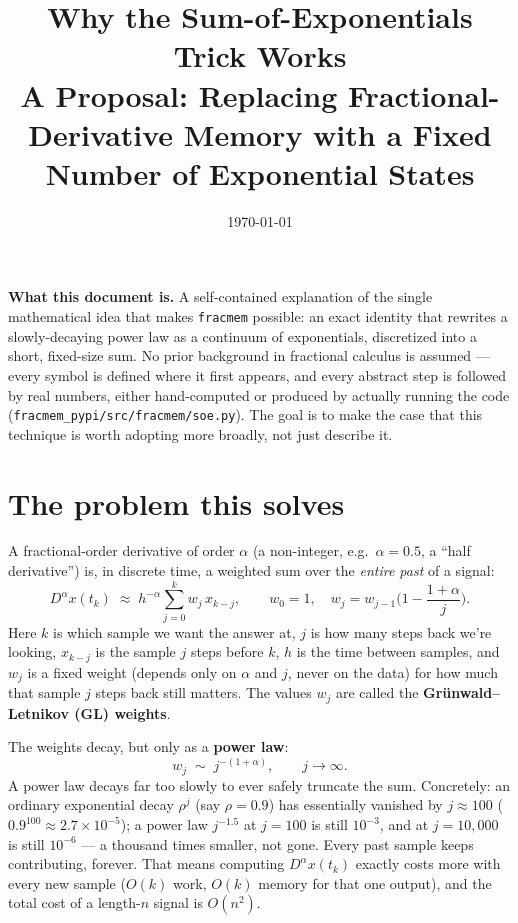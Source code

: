 \documentclass[11pt]{article}
\title{\textbf{Why the Sum-of-Exponentials Trick Works}\\[0.4em]
\large A Proposal: Replacing Fractional-Derivative Memory with a Fixed Number of Exponential States}
\author{}
\date{\today}
\begin{document}
\maketitle

\begin{cbox}
\textbf{What this document is.} A self-contained explanation of the single mathematical idea that makes \texttt{fracmem} possible: an exact identity that rewrites a slowly-decaying power law as a continuum of exponentials, discretized into a short, fixed-size sum. No prior background in fractional calculus is assumed --- every symbol is defined where it first appears, and every abstract step is followed by real numbers, either hand-computed or produced by actually running the code (\texttt{fracmem\_pypi/src/fracmem/soe.py}). The goal is to make the case that this technique is worth adopting more broadly, not just describe it.
\end{cbox}

\tableofcontents

\section{The problem this solves}

A fractional-order derivative of order $\alpha$ (a non-integer, e.g.\ $\alpha=0.5$, a ``half derivative'') is, in discrete time, a weighted sum over the \emph{entire past} of a signal:
\[
D^\alpha x(t_k) \;\approx\; h^{-\alpha}\sum_{j=0}^{k} w_j\, x_{k-j}, \qquad
w_0 = 1,\quad w_j = w_{j-1}\Big(1-\frac{1+\alpha}{j}\Big).
\]
Here $k$ is which sample we want the answer at, $j$ is how many steps back we're looking, $x_{k-j}$ is the sample $j$ steps before $k$, $h$ is the time between samples, and $w_j$ is a fixed weight (depends only on $\alpha$ and $j$, never on the data) for how much that sample $j$ steps back still matters. The values $w_j$ are called the \textbf{Gr\"unwald--Letnikov (GL) weights}.

The weights decay, but only as a \textbf{power law}:
\[
w_j \;\sim\; j^{-(1+\alpha)}, \qquad j\to\infty.
\]
A power law decays far too slowly to ever safely truncate the sum. Concretely: an ordinary exponential decay $\rho^j$ (say $\rho=0.9$) has essentially vanished by $j\approx 100$ ($0.9^{100}\approx 2.7\times10^{-5}$); a power law $j^{-1.5}$ at $j=100$ is still $10^{-3}$, and at $j=10{,}000$ is still $10^{-6}$ --- a thousand times smaller, not gone. Every past sample keeps contributing, forever. That means computing $D^\alpha x(t_k)$ exactly costs more with every new sample ($O(k)$ work, $O(k)$ memory for that one output), and the total cost of a length-$n$ signal is $O(n^2)$.
\end{document}
